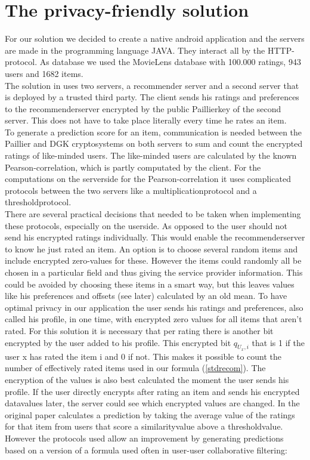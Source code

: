 \documentclass[twocolumn]{phdsymp} %
\begin{document}
\section{The privacy-friendly solution}
For our solution we decided to create a native android application and the servers are made in the programming language JAVA. They interact all by the HTTP-protocol. As database we used the MovieLens database with 100.000 ratings, 943 users and 1682 items.\\The solution in \cite{dyn} uses two servers, a recommender server and a second server that is deployed by a trusted third party. The client sends his ratings and preferences to the recommenderserver encrypted by the public Paillierkey of the second server. This does not have to take place literally every time he rates an item.\\To generate a prediction score for an item, communication is needed between the Paillier and DGK cryptosystems on both servers to sum and count the encrypted ratings of like-minded users. The like-minded users are calculated by the known Pearson-correlation, which is partly computated by the client. For the computations on the serverside for the Pearson-correlation it uses complicated protocols between the two servers like a multiplicationprotocol and a thresholdprotocol. \\There are several practical decisions that needed to be taken when implementing these protocols, especially on the userside. As opposed to \cite{dyn} the user should not send his encrypted ratings individually. This would enable the recommenderserver to know he just rated an item. An option is to choose several random items and include encrypted zero-values for these. However the items could randomly all be chosen in a particular field and thus giving the service provider information. This could be avoided by choosing these items in a smart way, but this leaves values like his preferences and offsets (see later) calculated by an old mean. To have optimal privacy in our application the user sends his ratings and preferences, also called his profile, in one time, with encrypted zero values for all items that aren't rated. For this solution it is necessary that per rating there is another bit encrypted by the user added to his profile. This encrypted bit $ q_{U_x,i} $ that is 1 if the user x has rated the item i and 0 if not. This makes it possible to count the number of effectively rated items used in our formula (\ref{stdrecom}). The encryption of the values is also best calculated the moment the user sends his profile. If the user directly encrypts after rating an item and sends his encrypted datavalues later,  the server could see which encrypted values are changed. In the original paper \cite{dyn} calculates a prediction by taking the average value of the ratings for that item from users that score a similarityvalue above a thresholdvalue. However the protocols used allow an improvement by generating predictions based on a version of a formula used often in user-user collaborative filtering:
\end{document}
